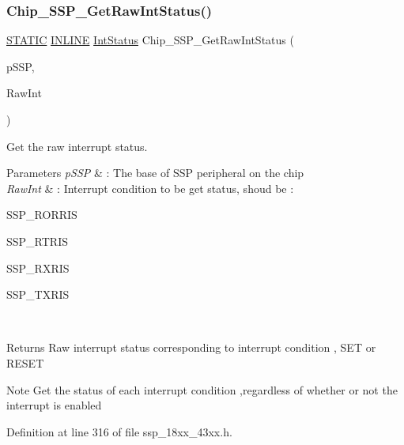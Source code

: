 \subsubsection{\texorpdfstring{Chip\+\_\+\+S\+S\+P\+\_\+\+Get\+Raw\+Int\+Status()}{Chip\_SSP\_GetRawIntStatus()}}
{\footnotesize\ttfamily \hyperlink{group___l_p_c___types___public___macros_ga10b2d890d871e1489bb02b7e70d9bdfb}{S\+T\+A\+T\+IC} \hyperlink{spifi__18xx__43xx_8h_a2eb6f9e0395b47b8d5e3eeae4fe0c116}{I\+N\+L\+I\+NE} \hyperlink{group___l_p_c___types___public___types_gab7d263072f745b4f3913fb0afc434c4e}{Int\+Status} Chip\+\_\+\+S\+S\+P\+\_\+\+Get\+Raw\+Int\+Status (\begin{DoxyParamCaption}\item[{\hyperlink{struct_l_p_c___s_s_p___t}{L\+P\+C\+\_\+\+S\+S\+P\+\_\+T} $\ast$}]{p\+S\+SP,  }\item[{\hyperlink{group___s_s_p__18_x_x__43_x_x_gaf901cb9befcf9302650fed7f1ddba443}{S\+S\+P\+\_\+\+R\+A\+W\+I\+N\+T\+S\+T\+A\+T\+U\+S\+\_\+T}}]{Raw\+Int }\end{DoxyParamCaption})}



Get the raw interrupt status. 


\begin{DoxyParams}{Parameters}
{\em p\+S\+SP} & \+: The base of S\+SP peripheral on the chip \\
\hline
{\em Raw\+Int} & \+: Interrupt condition to be get status, shoud be \+:
\begin{DoxyItemize}
\item S\+S\+P\+\_\+\+R\+O\+R\+R\+IS
\item S\+S\+P\+\_\+\+R\+T\+R\+IS
\item S\+S\+P\+\_\+\+R\+X\+R\+IS
\item S\+S\+P\+\_\+\+T\+X\+R\+IS 
\end{DoxyItemize}\\
\hline
\end{DoxyParams}
\begin{DoxyReturn}{Returns}
Raw interrupt status corresponding to interrupt condition , S\+ET or R\+E\+S\+ET 
\end{DoxyReturn}
\begin{DoxyNote}{Note}
Get the status of each interrupt condition ,regardless of whether or not the interrupt is enabled 
\end{DoxyNote}


Definition at line 316 of file ssp\+\_\+18xx\+\_\+43xx.\+h.

\mbox{\label{group___s_s_p__18_x_x__43_x_x_ga82dd278bcdbd80eaacc43abc211a970f}} 
